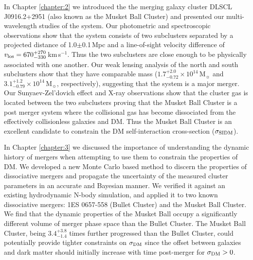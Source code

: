 In Chapter \ref{chapter:2} we introduced the the merging galaxy cluster DLSCL J0916.2+2951 (also known as the Musket Ball Cluster) and presented our multi-wavelength studies of the system.
Our photometric and spectroscopic observations show that the system consists of two subclusters separated by a projected distance of 1.0$\pm$0.1\,Mpc and a line-of-sight velocity difference of $v_{\rm los}=670^{+270}_{-330}$\,km\,s$^{-1}$.
Thus the two subclusters are close enough to be physically associated with one another.
Our weak lensing analysis of the north and south subclusters show that they have comparable mass ($1.7^{+2.0}_{-0.72}\times10^{14}$\,M$_\sun$  and $3.1^{+1.2}_{-0.79}\times10^{14}$\,M$_\sun$, respectively), suggesting that the system is a major merger.
Our Sunyaev-Zel'dovich effect and X-ray observations show that the cluster gas is located between the two subclusters proving that the Musket Ball Cluster is a post merger system where the collisional gas has become dissociated from the effectively collisionless galaxies and DM.
Thus the Musket Ball Cluster is an excellent candidate to constrain the DM self-interaction cross-section ($\sigma_{\rm SIDM}$).

In Chapter \ref{chapter:3} we discussed the importance of understanding the dynamic history of mergers when attempting to use them to constrain the properties of DM.
We developed a new Monte Carlo based method to discern the properties of dissociative mergers and propagate the uncertainty of the measured cluster parameters in an accurate and Bayesian manner.
We verified it against an existing hydrodynamic N-body simulation, and applied it to two known dissociative mergers: 1ES 0657-558 (Bullet Cluster) and the Musket Ball Cluster.
We find that the dynamic properties of the Musket Ball occupy a significantly different volume of merger phase space than the Bullet Cluster.
The Musket Ball Cluster, being $3.4^{+3.8}_{-1.4}$ times further progressed than the Bullet Cluster, could potentially provide tighter constraints on $\sigma_{\rm DM}$ since the offset between galaxies and dark matter should initially increase with time post-merger for  $\sigma_{\rm DM}>0$.

